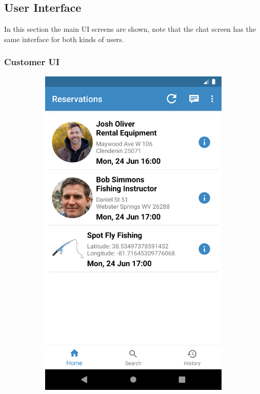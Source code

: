 \subsection{User Interface}
\begin{samepage}
In this section the main UI screens are shown, note that the chat screen has the same interface for both kinds of users.
\subsubsection{Customer UI}
\begin{figure}[h]
\centering
\begin{subfigure}{.5\textwidth}
  \centering
  \includegraphics[height=.3\textheight, keepaspectratio=true]{Img/CustomerHome}

\end{subfigure}
\end{figure}
\end{samepage}
